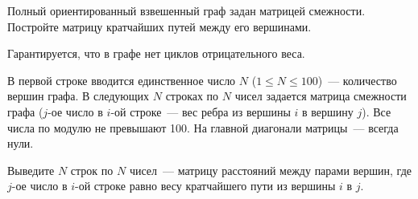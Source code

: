 

Полный ориентированный взвешенный граф задан матрицей смежности. Постройте матрицу кратчайших путей между его вершинами. 

Гарантируется, что в графе нет циклов отрицательного веса.

\InputFile
В первой строке вводится единственное число $N$ ($1 \leqslant N \leqslant 100$)~--- количество вершин графа. 
В следующих $N$ строках по $N$ чисел задается матрица смежности графа ($j$-ое 
число в $i$-ой строке~--- вес ребра из вершины $i$ в вершину $j$). 
Все числа по модулю не превышают 100. На главной диагонали матрицы~--- всегда нули.

\OutputFile
Выведите $N$ строк по $N$ чисел~--- матрицу расстояний между парами вершин, где
$j$-ое число в $i$-ой строке равно весу кратчайшего пути из вершины $i$ в $j$.



